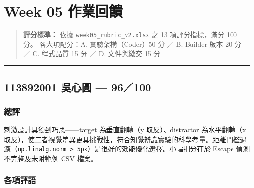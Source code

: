 \documentclass[14pt,]{extarticle}
\date{}
\begin{document}
\hypertarget{week-05-ux4f5cux696dux56deux994b}{%
\section{Week 05 作業回饋}\label{week-05-ux4f5cux696dux56deux994b}}

\begin{quote}
\textbf{評分標準：} 依據 \texttt{week05\_rubric\_v2.xlsx} 之 13
項評分指標，滿分 100 分。 各大項配分：A. 實驗架構（Coder）50 分 ／ B.
Builder 版本 20 分 ／ C. 程式品質 15 分 ／ D. 文件與繳交 15 分
\end{quote}

\begin{center}\rule{0.5\linewidth}{0.4pt}\end{center}

\hypertarget{ux5433ux5fc3ux5713-96100}{%
\subsection{113892001 吳心圓 ---
96／100}\label{ux5433ux5fc3ux5713-96100}}

\hypertarget{ux7e3dux8a55}{%
\subsubsection{總評}\label{ux7e3dux8a55}}

刺激設計具獨到巧思------target 為垂直翻轉（y 取反）、distractor
為水平翻轉（x
取反），使二者視覺差異更具挑戰性，符合知覺辨識實驗的科學考量。距離門檻過濾（\texttt{np.linalg.norm\ \textgreater{}\ 5px}）是很好的效能優化選擇。小幅扣分在於
Escape 偵測不完整及未附範例 CSV 檔案。

\hypertarget{ux5404ux9805ux8a55ux8a9e}{%
\subsubsection{各項評語}\label{ux5404ux9805ux8a55ux8a9e}}
\end{document}
